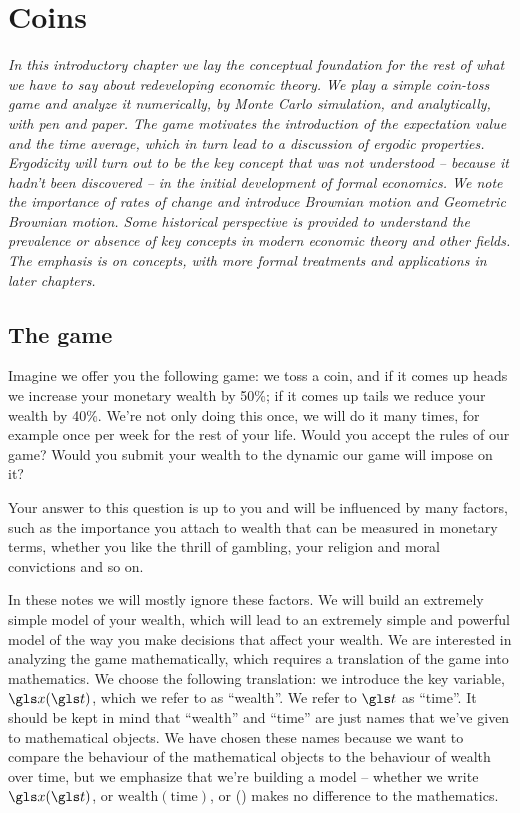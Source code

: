 
\section{Coins}

{\it In this introductory chapter we lay the conceptual foundation for the rest 
of what we have to say about redeveloping economic theory. We play a simple coin-toss game and analyze it 
numerically, by Monte Carlo simulation, and analytically, with pen and paper. The game motivates the 
introduction of the expectation value and the time average, which in turn 
lead to a discussion of ergodic properties. Ergodicity will turn out to be the key concept that was not understood -- because it hadn't been discovered -- in the initial development of formal economics. We note the importance of rates 
of change and introduce Brownian motion and Geometric Brownian motion.
Some historical perspective is provided to understand the prevalence or
absence of key concepts in modern economic theory and other fields.
The emphasis is on concepts, with more formal treatments and applications
in later chapters.}
\newpage

\subsection{The game}
Imagine we offer you the following game: we toss a coin, and if it comes 
up heads we increase your monetary wealth by 50\%; if 
it comes up tails we reduce your wealth by 40\%. We're not only 
doing this once, we will do it many times, for example 
once per week for the rest of your life. Would you accept 
the rules of our game? Would you submit your wealth to 
the dynamic our game will impose on it?

Your answer to this question is up to you and will be 
influenced by many factors, such as the importance 
you attach to wealth that can be measured in monetary 
terms, whether you like the thrill of gambling, your 
religion and moral convictions and so on.

In these notes we will mostly ignore these factors.
We will build an extremely simple model of your 
wealth, which will lead to an extremely simple and 
powerful model of the way you make decisions that affect 
your wealth. We are interested in analyzing the 
game mathematically, which requires a translation 
of the game into mathematics. We choose the 
following translation: we introduce the key 
variable, $\x(\t)$, which we refer to as ``wealth''. 
We refer to $\t$ as ``time''. It should be kept in mind that
``wealth'' and ``time'' are just names that we've given to 
mathematical objects. We have chosen these names because
we want to compare the behaviour of the mathematical
objects to the behaviour of wealth over time, but
we emphasize that we're building a model -- whether we write $\x(\t)$, 
or $\text{wealth}(\text{time})$, or \smiley(\frownie) makes no difference to the mathematics. 

